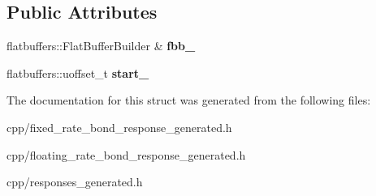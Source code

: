 \subsection*{Public Attributes}
\begin{DoxyCompactItemize}
\item 
\mbox{\label{structquantra_1_1FlowNotionalBuilder_ac0fa6a3762cd1105bbc1a8b56e5df673}} 
flatbuffers\+::\+Flat\+Buffer\+Builder \& {\bfseries fbb\+\_\+}
\item 
\mbox{\label{structquantra_1_1FlowNotionalBuilder_a6e574396799522db02de0ad3d15bc82b}} 
flatbuffers\+::uoffset\+\_\+t {\bfseries start\+\_\+}
\end{DoxyCompactItemize}


The documentation for this struct was generated from the following files\+:\begin{DoxyCompactItemize}
\item 
cpp/fixed\+\_\+rate\+\_\+bond\+\_\+response\+\_\+generated.\+h\item 
cpp/floating\+\_\+rate\+\_\+bond\+\_\+response\+\_\+generated.\+h\item 
cpp/responses\+\_\+generated.\+h\end{DoxyCompactItemize}
